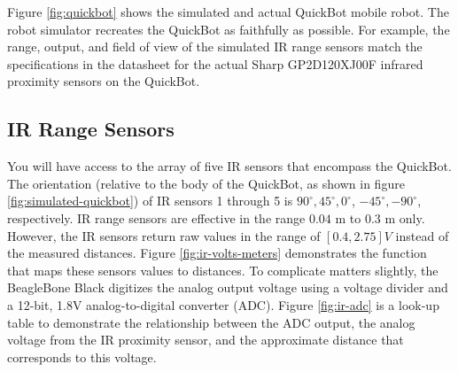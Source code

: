 \documentclass[10pt]{article}
\begin{document}
Figure \ref{fig:quickbot} shows the simulated and actual QuickBot mobile robot. The robot simulator recreates the QuickBot as faithfully as possible. For example, the range, output, and field of view of the simulated IR range sensors match the specifications in the datasheet for the actual Sharp GP2D120XJ00F infrared proximity sensors on the QuickBot.

\subsection{IR Range Sensors}\label{irprox}
You will have access to the array of five IR sensors that encompass the QuickBot. The orientation (relative to the body of the QuickBot, as shown in figure \ref{fig:simulated-quickbot}) of IR sensors 1 through 5 is $90^\circ, 45^\circ, 0^\circ$, $-45^\circ, -90^\circ$, respectively. IR range sensors are effective in the range $0.04$ m to $0.3$ m only. However, the IR sensors return raw values in the range of $[0.4,2.75] V$ instead of the measured distances. Figure \ref{fig:ir-volts-meters} demonstrates the function that maps these sensors values to distances. To complicate matters slightly, the BeagleBone Black digitizes the analog output voltage using a voltage divider and a 12-bit, 1.8V analog-to-digital converter (ADC). Figure \ref{fig:ir-adc} is a look-up table to demonstrate the relationship between the ADC output, the analog voltage from the IR proximity sensor, and the approximate distance that corresponds to this voltage.
\end{document}
